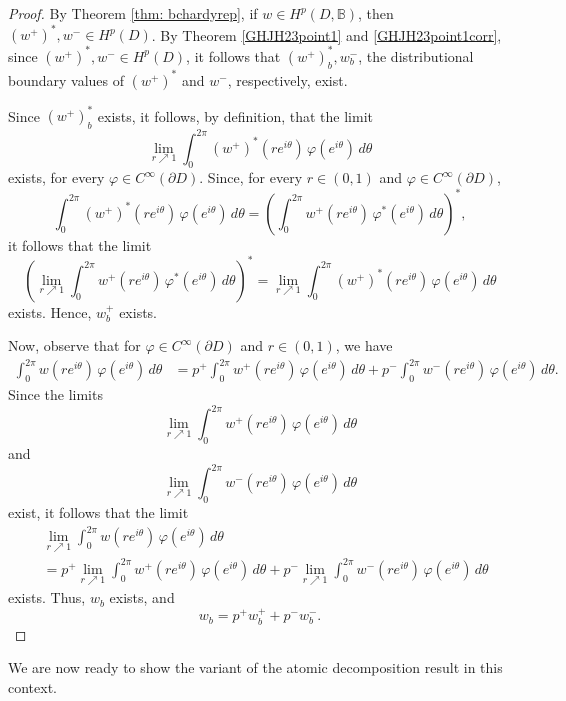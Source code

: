 \documentclass[suppldata]{interact}
\theoremstyle{plain}%
\theoremstyle{definition}
\theoremstyle{remark}
\newcommand{\p}{\partial}
\newcommand{\bc}{\mathbb{B}}
\newcommand{\hpb}{H^p(D,\bc)}
\begin{document}
\begin{proof}
    By Theorem \ref{thm: bchardyrep}, if $w \in \hpb$, then $(w^+)^*, w^- \in H^p(D)$. By Theorem \ref{GHJH23point1} and \ref{GHJH23point1corr}, since $(w^+)^*, w^- \in H^p(D)$, it follows that $(w^+)^*_b, w^-_b$, the distributional boundary values of $(w^+)^*$ and $w^-$, respectively, exist. 
    
    Since $(w^+)^*_b$ exists, it follows, by definition, that the limit
    \[
        \lim_{r\nearrow 1} \int_0^{2\pi} (w^+)^*(re^{i\theta}) \,\varphi(e^{i\theta})\,d\theta
    \]
    exists, for every $\varphi \in C^\infty(\p D)$. Since, for every $r \in (0,1)$ and $\varphi \in C^\infty(\p D)$, 
    \[
        \int_0^{2\pi} (w^+)^*(re^{i\theta}) \,\varphi(e^{i\theta})\,d\theta 
        = \left( \int_0^{2\pi} w^+(re^{i\theta}) \,\varphi^*(e^{i\theta})\,d\theta \right)^*,
    \]
    it follows that the limit
    \[
        \left( \lim_{r\nearrow 1}\int_0^{2\pi} w^+(re^{i\theta}) \,\varphi^*(e^{i\theta})\,d\theta \right)^* = 
       \lim_{r\nearrow 1} \int_0^{2\pi} (w^+)^*(re^{i\theta}) \,\varphi(e^{i\theta})\,d\theta 
    \]
    exists. Hence, $w^+_b$ exists. 

    
    Now, observe that for $\varphi \in C^{\infty}(\p D)$ and $r \in (0,1)$, we have
    \begin{align*}
        \int_0^{2\pi} w(re^{i\theta}) \,\varphi(e^{i\theta})\,d\theta
        &=  p^+\int_0^{2\pi} w^+(re^{i\theta}) \,\varphi(e^{i\theta})\,d\theta + p^-\int_0^{2\pi} w^-(re^{i\theta}) \,\varphi(e^{i\theta})\,d\theta.
    \end{align*}
    Since the limits
    \[
        \lim_{r\nearrow 1} \int_0^{2\pi} w^+(re^{i\theta}) \,\varphi(e^{i\theta})\,d\theta 
    \]
    and
    \[
\lim_{r\nearrow 1} \int_0^{2\pi} w^-(re^{i\theta}) \,\varphi(e^{i\theta})\,d\theta 
    \]
    exist, it follows that the limit
    \begin{align*}
       & \lim_{r \nearrow 1}\int_0^{2\pi} w(re^{i\theta}) \,\varphi(e^{i\theta})\,d\theta \\
        &=  p^+\lim_{r \nearrow 1}\int_0^{2\pi} w^+(re^{i\theta}) \,\varphi(e^{i\theta})\,d\theta + p^-\lim_{r \nearrow 1}\int_0^{2\pi} w^-(re^{i\theta}) \,\varphi(e^{i\theta})\,d\theta
    \end{align*}
    exists. Thus, $w_b$ exists, and 
    \[
        w_b = p^+ w^+_b + p^- w^-_b.
    \]
\end{proof}

We are now ready to show the variant of the atomic decomposition result in this context. 
\end{document}
